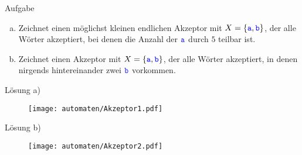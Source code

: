 \begin{frame}{Aufgabe}
	\begin{enumerate}[a)]
		\item Zeichnet einen möglichst kleinen endlichen Akzeptor mit $ X = \{\hbox{\textcolor{blue}{\texttt{a}}}, \hbox{\textcolor{blue}{\texttt{b}}}\}$, der alle Wörter akzeptiert, bei denen die Anzahl der $\hbox{\textcolor{blue}{\texttt{a}}}$ durch $5$ teilbar ist.
		\item Zeichnet einen Akzeptor mit $ X = \{\hbox{\textcolor{blue}{\texttt{a}}},\hbox{\textcolor{blue}{\texttt{b}}}\}$, der alle Wörter akzeptiert, in denen nirgends hintereinander zwei $\hbox{\textcolor{blue}{\texttt{b}}}$ vorkommen.
	\end{enumerate}		
\end{frame}

\begin{frame} {Lösung a)}
	\begin{figure}[H] \texttt{[image: automaten/Akzeptor1.pdf]} \end{figure}		
\end{frame} 

\begin{frame}{Lösung b)}
	\begin{figure}[H] \texttt{[image: automaten/Akzeptor2.pdf]} \end{figure}
\end{frame}

